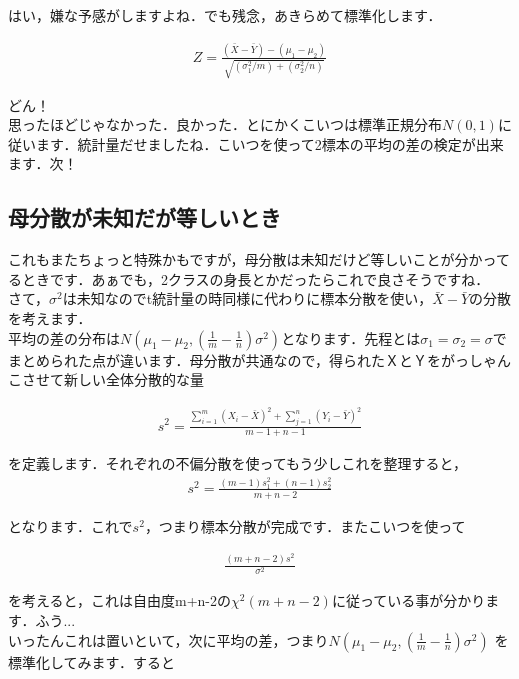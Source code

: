\documentclass[11pt,a4paper,uplatex]{ujreport} 	%
\begin{document}
はい，嫌な予感がしますよね．でも残念，あきらめて標準化します．

\begin{align}
  Z = \frac{(\bar{X} - \bar{Y})-(\mu_1-\mu_2)}{\sqrt{(\sigma_1^2/m)+(\sigma_2^2/n)}}
  \label{eq:z2}
\end{align}

どん！\\

思ったほどじゃなかった．良かった．とにかくこいつは標準正規分布$N(0,1)$に従います．統計量だせましたね．こいつを使って2標本の平均の差の検定が出来ます．次！



\subsection{母分散が未知だが等しいとき}
これもまたちょっと特殊かもですが，母分散は未知だけど等しいことが分かってるときです．あぁでも，2クラスの身長とかだったらこれで良さそうですね．\\

さて，$\sigma^2$は未知なのでt統計量の時同様に代わりに標本分散を使い，$\bar{X}- \bar{Y}$の分散を考えます．\\

平均の差の分布は$N(\mu_1 -\mu_2, (\frac{1}{m} - \frac{1}{n})\sigma^2)$となります．先程とは$\sigma_1=\sigma_2=\sigma$でまとめられた点が違います．母分散が共通なので，得られたＸとＹをがっしゃんこさせて新しい全体分散的な量

\begin{align}
  s^2 = \frac{\sum_{i=1}^m (X_i-\bar{X})^2 + \sum_{j=1}^n (Y_i - \bar{Y})^2}{m-1 + n-1}
  \label{eq:combined-s}
\end{align}

を定義します．それぞれの不偏分散を使ってもう少しこれを整理すると，
\begin{align}
  s^2 = \frac{(m-1)s_1^2 + (n-1)s_2^2}{m+n-2}
  \label{eq:combined-s2}
\end{align}

となります．これで$s^2$，つまり標本分散が完成です．またこいつを使って

\begin{align}
  \frac{(m+n-2)s^2}{\sigma^2}
  \label{eq:chi}
\end{align}


を考えると，これは自由度m+n-2の$\chi^2(m+n-2)$に従っている事が分かります．ふう...\\

いったんこれは置いといて，次に平均の差，つまり$N(\mu_1 -\mu_2, (\frac{1}{m} - \frac{1}{n})\sigma^2)$
を標準化してみます．すると
\end{document}
